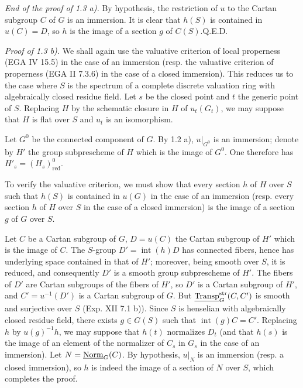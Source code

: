 \par\noindent\emph{End of the proof of 1.3 a).}
By hypothesis, the restriction of $u$ to the Cartan subgroup $C$ of $G$ is an immersion. It is clear that $h(S)$ is contained in $u(C)=D$, so $h$ is the image of a section $g$ of $C(S)$.\hfill Q.E.D.

\par\noindent\emph{Proof of 1.3 b).}
We shall again use the valuative criterion of local properness (EGA IV 15.5) in the case of an immersion (resp. the valuative criterion of properness (EGA II 7.3.6) in the case of a closed immersion). This reduces us to the case where $S$ is the spectrum of a complete discrete valuation ring with algebraically closed residue field. Let $s$ be the closed point and $t$ the generic point of $S$. Replacing $H$ by the schematic closure in $H$ of $u_t(G_t)$, we may suppose that $H$ is flat over $S$ and $u_t$ is an isomorphism.

Let $G^0$ be the connected component of $G$. By 1.2 a), $u|_{G^0}$ is an immersion; denote by $H'$ the group subprescheme of $H$ which is the image of $G^0$. One therefore has $H'_s=(H_s)^0_{\mathrm{red}}$.

To verify the valuative criterion, we must show that every section $h$ of $H$ over $S$ such that $h(S)$ is contained in $u(G)$ in the case of an immersion (resp. every section $h$ of $H$ over $S$ in the case of a closed immersion) is the image of a section $g$ of $G$ over $S$.

Let $C$ be a Cartan subgroup of $G$, $D=u(C)$ the Cartan subgroup of $H'$ which is the image of $C$. The $S$-group $D'=\operatorname{int}(h)D$ has connected fibers, hence has underlying space contained in that of $H'$; moreover, being smooth over $S$, it is reduced, and consequently $D'$ is a smooth group subprescheme of $H'$. The fibers of $D'$ are Cartan subgroups of the fibers of $H'$, so $D'$ is a Cartan subgroup of $H'$, and $C'=u^{-1}(D')$ is a Cartan subgroup of $G$. But $\underline{\operatorname{Transp}}_G^{\mathrm{str}}(C,C')$ is smooth and surjective over $S$ (Exp. XII 7.1 b)). Since $S$ is henselian with algebraically closed residue field, there exists $g\in G(S)$ such that $\operatorname{int}(g)C=C'$. Replacing $h$ by $u(g)^{-1}h$, we may suppose that $h(t)$ normalizes $D_t$ (and that $h(s)$ is the image of an element of the normalizer of $C_s$ in $G_s$ in the case of an immersion). Let $N=\underline{\mathrm{Norm}}_G(C)$. By hypothesis, $u|_N$ is an immersion (resp. a closed immersion), so $h$ is indeed the image of a section of $N$ over $S$, which completes the proof.


